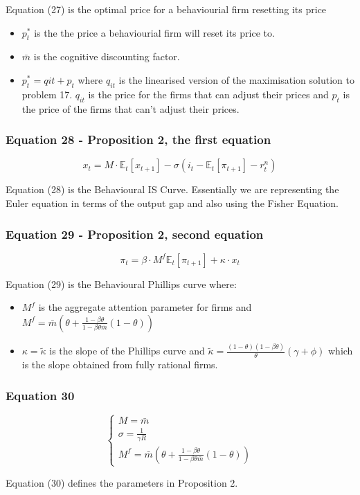 \documentclass{article}
\begin{document}
Equation (27) is the optimal price for a behaviourial firm resetting its price
\begin{itemize}
    \item $p^{*}_{t}$ is the the price a behaviourial firm will reset its price to. 
    \item $\bar{m}$ is the cognitive discounting factor. 
    \item $p^{*}_{t}= q{it}+p_{t}$ where $q_{it}$ is the linearised version of the maximisation solution to problem 17. $q_{it}$ is the price for the firms that can adjust their prices and $p_{t}$ is the price of the firms that can't adjust their prices.
\end{itemize}

\subsubsection*{Equation 28 - Proposition 2, the first equation}
\begin{equation}\tag{28}
    x_{t}=M\cdot\mathbb{E}_{t}\left[x_{t+1}\right]-\sigma(i_{t}-\mathbb{E}_{t}\left[\pi_{t+1}\right]-r^{n}_{t})
\end{equation}

Equation (28) is the Behavioural IS Curve. Essentially we are representing the Euler equation in terms of the output gap and also using the Fisher Equation.

\subsubsection*{Equation 29 - Proposition 2, second equation}
\begin{equation}\tag{29}
    \pi_{t}=\beta\cdot M^{f} \mathbb{E}_{t}\left[\pi_{t+1}\right]+\kappa\cdot x_{t}
\end{equation}

Equation (29) is the Behavioural Phillips curve where: 
\begin{itemize}
    \item $M^{f}$ is the aggregate attention parameter for firms and $M^{f}=\bar{m}\left(\theta+\frac{1-\beta\theta}{1-\beta\theta\bar{m}}(1-\theta)\right)$
    \item $\kappa=\widetilde{\kappa}$  is the slope of the Phillips curve and $\widetilde{\kappa} =  \frac{(1-\theta)(1-\beta\theta)}{\theta}(\gamma+\phi)$ which is the slope obtained from fully rational firms. 

\end{itemize}

\subsubsection*{Equation 30}
\begin{equation}\tag{30}
    \begin{cases}
        M=\bar{m} \\
        \sigma=\frac{1}{\gamma R} \\
        M^{f}=\bar{m}\left(\theta+\frac{1-\beta\theta}{1-\beta\theta\bar{m}}(1-\theta)\right)
    \end{cases}
\end{equation}

Equation (30) defines the parameters in Proposition 2.
\end{document}
